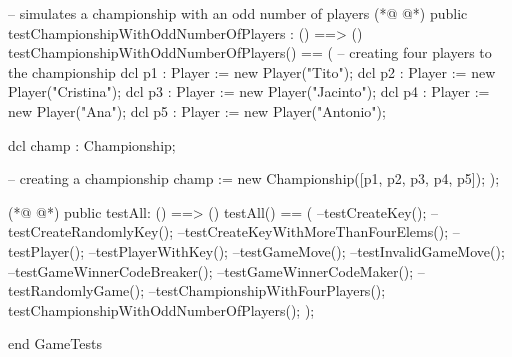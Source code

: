 \begin{vdmpp}[breaklines=true]
  -- simulates a championship with an odd number of players
(*@
\label{testChampionshipWithOddNumberOfPlayers:262}
@*)
  public testChampionshipWithOddNumberOfPlayers : () ==> ()
   testChampionshipWithOddNumberOfPlayers() == (
    -- creating four players to the championship
    dcl p1 : Player := new Player("Tito");
    dcl p2 : Player := new Player("Cristina");
    dcl p3 : Player := new Player("Jacinto");
    dcl p4 : Player := new Player("Ana");
    dcl p5 : Player := new Player("Antonio");
    
    dcl champ : Championship;
    
    -- creating a championship
    champ := new Championship([p1, p2, p3, p4, p5]);
   );
  
(*@
\label{testAll:277}
@*)
  public testAll: () ==> ()
  testAll() == (
   --testCreateKey();
   --testCreateRandomlyKey();
   --testCreateKeyWithMoreThanFourElems();
    --testPlayer();
    --testPlayerWithKey();
    --testGameMove();
    --testInvalidGameMove();
    --testGameWinnerCodeBreaker();
    --testGameWinnerCodeMaker();
    --testRandomlyGame();
    --testChampionshipWithFourPlayers();
    testChampionshipWithOddNumberOfPlayers();
  );
  
end GameTests
\end{vdmpp}
